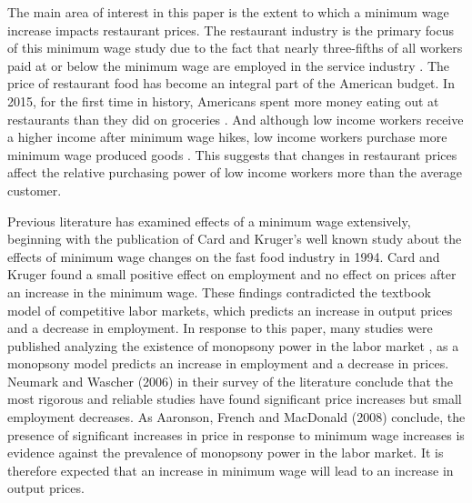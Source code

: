 \documentclass[11pt]{article}
\begin{document}
The main area of interest in this paper is the extent to which a minimum wage increase impacts restaurant prices. The restaurant industry is the primary focus of this minimum wage study due to the fact that nearly three-fifths of all workers paid at or below the minimum wage are employed in the service industry \cite{charsmw}. The price of restaurant food has become an integral part of the American budget. In 2015, for the first time in history, Americans spent more money eating out at restaurants than they did on groceries \cite{usda}. And although low income workers receive a higher income after minimum wage hikes, low income workers purchase more minimum wage produced goods \cite{macurdy2000increasing}. This suggests that changes in restaurant prices affect the relative purchasing power of low income workers more than the average customer. 

Previous literature has examined effects of a minimum wage extensively, beginning with the publication of Card and Kruger's well known study about the effects of minimum wage changes on the fast food industry in 1994\nocite{card1994minimum}. Card and Kruger found a small positive effect on employment and no effect on prices after an increase in the minimum wage. These findings contradicted the textbook model of competitive labor markets, which predicts an increase in output prices and a decrease in employment. In response to this paper, many studies were published analyzing the existence of monopsony power in the labor market \cite{manning1995we, rebitzer1995consequences, burdett1998wage, bhaskar1999minimum}, as a monopsony model predicts an increase in employment and a decrease in prices. Neumark and Wascher (2006)\nocite{neumark2006minimum} in their survey of the literature conclude that the most rigorous and reliable studies have found significant price increases but small employment decreases. As Aaronson, French and MacDonald (2008) conclude\nocite{aaronson2008minimum}, the presence of significant increases in price in response to minimum wage increases is evidence against the prevalence of monopsony power in the labor market. It is therefore expected that an increase in minimum wage will lead to an increase in output prices.
\end{document}
